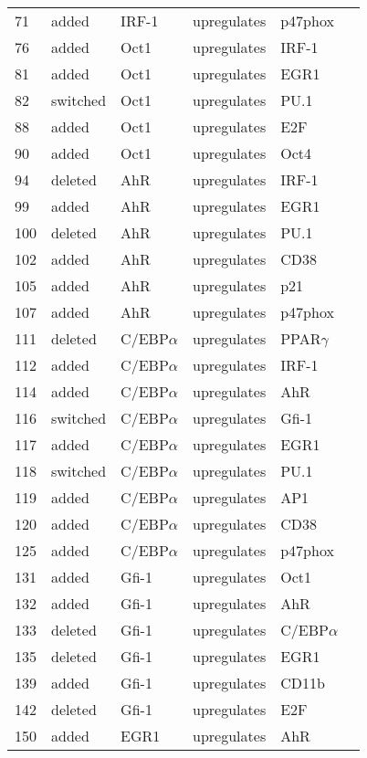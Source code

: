 \begin{center}
\begin{scriptsize}
\begin{supertabular}{|p{2 cm}|p{2cm}|p{3cm}|p{2.5cm}|p{2cm}|p{1.5cm}|}
71 &  added &  IRF-1  & upregulates &  p47phox & \\
76 &  added &  Oct1  & upregulates &  IRF-1 & \\
81 &  added &  Oct1  & upregulates &  EGR1 & \\
82 &  switched &  Oct1  & upregulates &  PU.1 & \\
88 &  added &  Oct1  & upregulates &  E2F & \\
90 &  added &  Oct1  & upregulates &  Oct4 & \\
94 &  deleted &  AhR  & upregulates &  IRF-1 & \\
99 &  added &  AhR  & upregulates &  EGR1 & \cite{Martinez2004}\\
100 &  deleted &  AhR  & upregulates &  PU.1 & \\
102 &  added &  AhR  & upregulates &  CD38 & \\
105 &  added &  AhR  & upregulates &  p21 & \\
107 &  added &  AhR  & upregulates &  p47phox & \\
111 &  deleted &  C/EBP$\alpha$  & upregulates &  PPAR$\gamma$ & \\
112 &  added &  C/EBP$\alpha$  & upregulates &  IRF-1 & \\
114 &  added &  C/EBP$\alpha$  & upregulates &  AhR & \\
116 &  switched &  C/EBP$\alpha$  & upregulates &  Gfi-1 & \\
117 &  added &  C/EBP$\alpha$  & upregulates &  EGR1 & \\
118 &  switched &  C/EBP$\alpha$  & upregulates &  PU.1 & \\
119 &  added &  C/EBP$\alpha$  & upregulates &  AP1 & \\
120 &  added &  C/EBP$\alpha$  & upregulates &  CD38 & \\
125 &  added &  C/EBP$\alpha$  & upregulates &  p47phox & \\
131 &  added &  Gfi-1  & upregulates &  Oct1 & \\
132 &  added &  Gfi-1  & upregulates &  AhR & \\
133 &  deleted &  Gfi-1  & upregulates &  C/EBP$\alpha$ & \\
135 &  deleted &  Gfi-1  & upregulates &  EGR1 & \\
139 &  added &  Gfi-1  & upregulates &  CD11b & \\
142 &  deleted &  Gfi-1  & upregulates &  E2F & \\
150 &  added &  EGR1  & upregulates &  AhR & \\

\end{supertabular}
\end{scriptsize}
\end{center}
